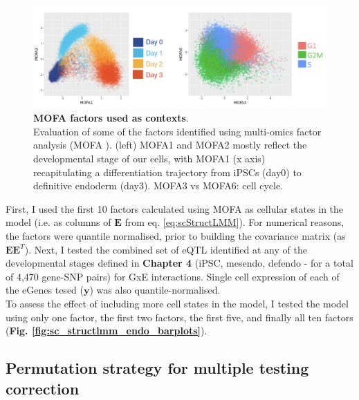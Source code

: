 \begin{figure}[h]
\centering
\includegraphics[width=15.5cm]{Chapter6/Fig/MOFA_factors.png}
\caption[MOFA factors used as contexts]{\textbf{MOFA factors used as contexts}.\\
Evaluation of some of the factors identified using multi-omics factor analysis (MOFA \cite{argelaguet2018multi}).
(left) MOFA1 and MOFA2 mostly reflect the developmental stage of our cells, with MOFA1 (x axis) recapitulating a differentiation trajectory from iPSCs (day0) to definitive endoderm (day3).
MOFA3 vs MOFA6: cell cycle.}
\label{fig:sc_structlmm_endo_mofa_factors}
\end{figure}

First, I used the first 10 factors calculated using MOFA as cellular states in the model (i.e. as columns of $\mathbf{E}$ from eq. \eqref{eq:scStructLMM}).
For numerical reasons, the factors were quantile normalised, prior to building the covariance matrix (as $\mathbf{E}\mathbf{E}^T$). 
Next, I tested the combined set of eQTL identified at any of the developmental stages defined in \textbf{Chapter 
4} (iPSC, mesendo, defendo - for a total of 4,470 gene-SNP pairs) for GxE interactions.
Single cell expression of each of the eGenes tesed ($\mathbf{y}$) was also quantile-normalised. \\

To assess the effect of including more cell states in the model, I tested the model using only one factor, the first two factors, the first five, and finally all ten factors (\textbf{Fig. \ref{fig:sc_structlmm_endo_barplots}}).

\newpage



\subsection{Permutation strategy for multiple testing correction}

